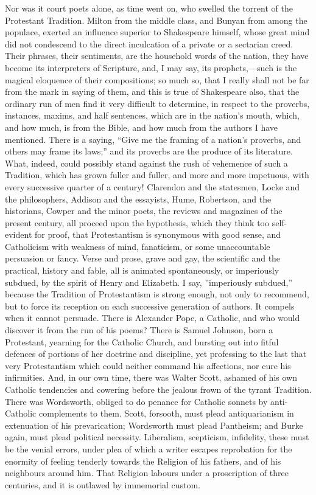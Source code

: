 Nor was it court poets alone, as time went on, who
swelled the torrent of the Protestant Tradition. Milton
from the middle class, and Bunyan from among the
populace, exerted an influence superior to Shakespeare
himself, whose great mind did not condescend to the
direct inculcation of a private or a sectarian creed.
Their phrases, their sentiments, are the household words
of the nation, they have become its interpreters of
Scripture, and, I may say, its prophets,—such is the
magical eloquence of their compositions; so much so, that
I really shall not be far from the mark in saying of
them, and this is true of Shakespeare also, that the
ordinary run of men find it very difficult to determine,
in respect to the proverbs, instances, maxims, and half
sentences, which are in the nation's mouth, which, and
how much, is from the Bible, and how much from the
authors I have mentioned. There is a saying, ``Give
me the framing of a nation's proverbs, and others may
frame its laws;'' and its proverbs are the produce of
its literature. What, indeed, could possibly stand
against the rush of vehemence of such a Tradition, which
has grown fuller and fuller, and more and more impetuous,
with every successive quarter of a century! Clarendon and
the statesmen, Locke and the philosophers, Addison and
the essayists, Hume, Robertson, and the historians,
Cowper and the minor poets, the reviews and magazines of
the present century, all proceed upon the hypothesis,
which they think too self-evident for proof, that
Protestantism is synonymous with good sense, and
Catholicism with weakness of mind, fanaticism, or some
unaccountable persuasion or fancy. Verse and prose, grave
and gay, the scientific and the practical, history and
fable, all is animated spontaneously, or imperiously
subdued, by the spirit of Henry and Elizabeth. I say,
''imperiously subdued,'' because the Tradition of
Protestantism is strong enough, not only to recommend,
but to force its reception on each successive generation
of authors. It compels when it cannot persuade. There is
Alexander Pope, a Catholic, and who would discover it
from the run of his poems? There is Samuel Johnson, born
a Protestant, yearning for the Catholic Church, and
bursting out into fitful defences of portions of her
doctrine and discipline, yet professing to the last that
very Protestantism which could neither command his
affections, nor cure his infirmities. And, in our own
time, there was Walter Scott, ashamed of his own Catholic
tendencies and cowering before the jealous frown of the
tyrant Tradition. There was Wordsworth, obliged to do
penance for Catholic sonnets by anti-Catholic complements
to them. Scott, forsooth, must plead antiquarianism in
extenuation of his prevarication; Wordsworth must plead
Pantheism; and Burke again, must plead political
necessity. Liberalism, scepticism, infidelity, these must
be the venial errors, under plea of which a writer
escapes reprobation for the enormity of feeling tenderly
towards the Religion of his fathers, and of his
neighbours around him. That Religion labours under a
proscription of three centuries, and it is outlawed by
immemorial custom.

